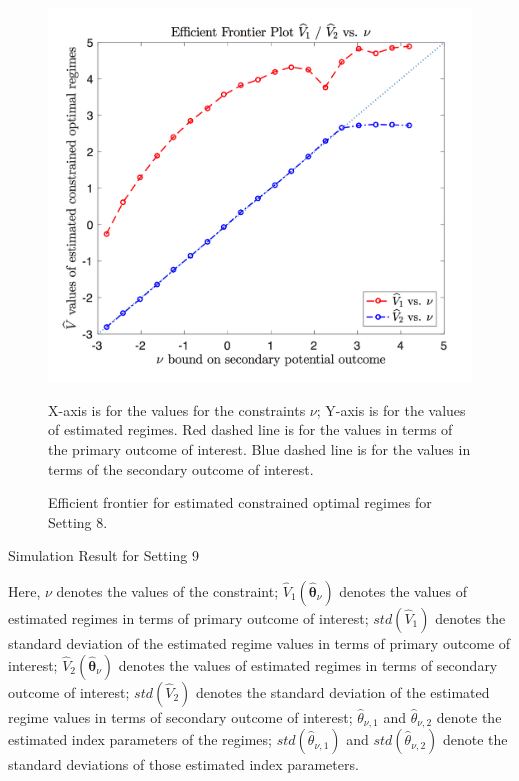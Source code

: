 \documentclass{article}
\newcommand{\wh}{\widehat}
\newcommand{\bs}{ \boldsymbol}
\begin{document}
\begin{appendices}
\begin{figure}[!htb]
	\includegraphics[width=.9\linewidth]{./figs/efficient_plot8.png}
	\caption{Efficient frontier for estimated constrained optimal regimes for Setting 8.}
	\label{fig:8}
	\justify
X-axis is for the values for the constraints $\nu$; Y-axis is for the values of estimated regimes. Red dashed line is for the values in terms of the primary outcome of interest. Blue dashed line is for the values in terms of the secondary outcome of interest.
\end{figure}
\begin{table}[!htbp]
	\caption {Simulation Result for Setting 9}
	\centering
	{\tt
		
	}
	\justify
	Here, $\nu$ denotes the values of the constraint; $\wh{V}_1(\wh{\bs{\theta}}_{\nu})$ denotes the values of estimated regimes in terms of primary outcome of interest; $std(\wh{V}_1)$ denotes the standard deviation of the estimated regime values in terms of primary outcome of interest; $\wh{V}_2(\wh{\bs{\theta}}_{\nu})$ denotes the values of estimated regimes in terms of secondary outcome of interest; $std(\wh{V}_2)$ denotes the standard deviation of the estimated regime values in terms of secondary outcome of interest; $\wh{\theta}_{\nu,1}$ and $\wh{\theta}_{\nu,2}$ denote the estimated index parameters of the regimes; $std(\wh{\theta}_{\nu,1})$ and $std(\wh{\theta}_{\nu,2})$ denote the standard deviations of those estimated index parameters.	
\end{table} 
\begin{figure}[!htb]
	\centering

\end{figure}
\end{appendices}
\end{document}
